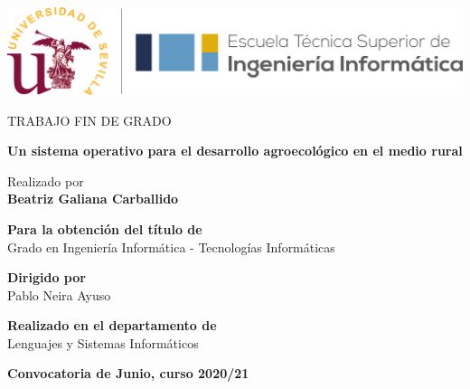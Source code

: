 \begin{center}

\vspace*{1cm}

\includegraphics[width=\textwidth]{fig/etsii_us.png}

\vspace*{3cm}
\begin{large}
TRABAJO FIN DE GRADO
\end{large}

\vspace*{0.1in}
\textbf{\huge Un sistema operativo para el desarrollo agroecológico en el medio rural} %

\vspace*{.2in}

{\large Realizado por}\\
\textbf{\Large Beatriz Galiana Carballido} %

\vspace*{3cm}

\textbf{Para la obtención del título de}\\
{\large Grado en Ingeniería Informática - Tecnologías Informáticas} %

\vspace*{0.2in}

\textbf{Dirigido por}\\
{\large Pablo Neira Ayuso}\\ %

\vspace*{0.2in}

\textbf{Realizado en el departamento de}\\
{\large Lenguajes y Sistemas Informáticos}

\vspace*{.6in}
\textbf{\Large Convocatoria de Junio, curso 2020/21} %

\end{center}


\thispagestyle{empty} %
\clearpage\setcounter{page}{1} %
